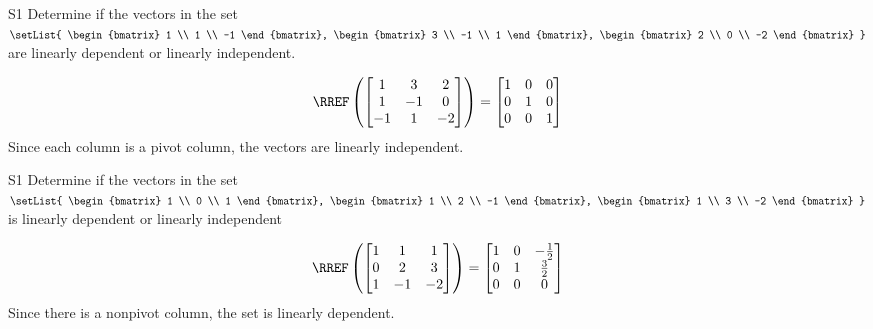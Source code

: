 \begin{problem}{S1}
Determine if the vectors in the set
\(\setList{
  \begin{bmatrix} 1 \\ 1 \\ -1 \end{bmatrix},
  \begin{bmatrix} 3 \\ -1 \\ 1 \end{bmatrix},
  \begin{bmatrix} 2 \\ 0 \\ -2 \end{bmatrix}
}\)
are linearly dependent or linearly independent.
\end{problem}
\begin{solution}
\[
  \RREF\left(
    \begin{bmatrix} 1 & 3 & 2 \\ 1 & -1 & 0 \\ -1 & 1 & -2 \end{bmatrix}
  \right)
    =
  \begin{bmatrix} 1 & 0 &0 \\ 0 & 1 & 0 \\ 0 & 0 & 1\end{bmatrix}
\]
Since each column is a pivot column, the vectors are linearly independent.
\end{solution}


\begin{problem}{S1}
Determine if the vectors in the set
\(
  \setList{
    \begin{bmatrix} 1 \\ 0 \\ 1 \end{bmatrix},
    \begin{bmatrix} 1 \\ 2 \\ -1 \end{bmatrix},
    \begin{bmatrix} 1 \\ 3 \\ -2 \end{bmatrix}
  }
\)
is linearly dependent or linearly independent
\end{problem}
\begin{solution}
\[
  \RREF\left(
    \begin{bmatrix} 1 &  1 & 1 \\ 0  & 2 & 3 \\ 1  & -1 & -2 \end{bmatrix}
  \right)
    =
  \begin{bmatrix} 1 &  0 & -\frac{1}{2} \\ 0  & 1 & \frac{3}{2} \\ 0& 0 & 0  \end{bmatrix}
\]
Since there is a nonpivot column, the set is linearly dependent.
\end{solution}


